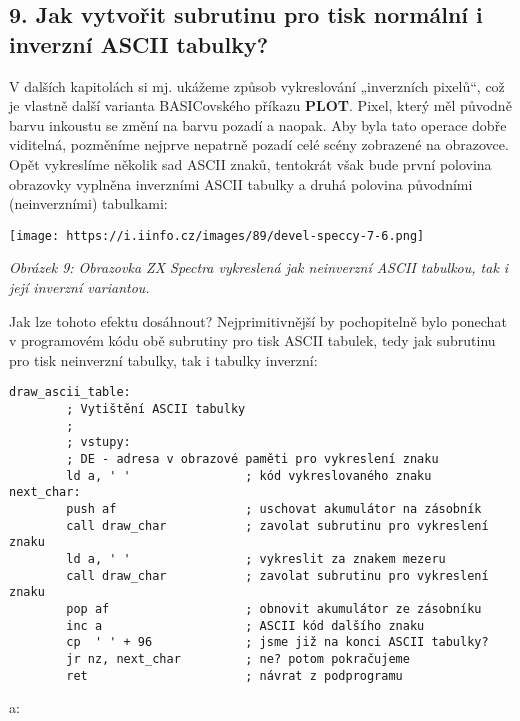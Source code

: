 \documentclass{article}
\renewcommand\includegraphics[2][]{}
\begin{document}
\hypertarget{k09}{%
\subsection{9. Jak vytvořit subrutinu pro tisk normální i inverzní ASCII
tabulky?}\label{k09}}

V dalších kapitolách si mj. ukážeme způsob vykreslování „inverzních
pixelů``, což je vlastně další varianta BASICovského příkazu
\textbf{PLOT}. Pixel, který měl původně barvu inkoustu se změní na barvu
pozadí a naopak. Aby byla tato operace dobře viditelná, pozměníme
nejprve nepatrně pozadí celé scény zobrazené na obrazovce. Opět
vykreslíme několik sad ASCII znaků, tentokrát však bude první polovina
obrazovky vyplněna inverzními ASCII tabulky a druhá polovina původními
(neinverzními) tabulkami:

\texttt{[image: https://i.iinfo.cz/images/89/devel-speccy-7-6.png]}

\emph{Obrázek 9: Obrazovka ZX Spectra vykreslená jak neinverzní ASCII
tabulkou, tak i její inverzní variantou.}

Jak lze tohoto efektu dosáhnout? Nejprimitivnější by pochopitelně bylo
ponechat v programovém kódu obě subrutiny pro tisk ASCII tabulek, tedy
jak subrutinu pro tisk neinverzní tabulky, tak i tabulky inverzní:

\begin{verbatim}
draw_ascii_table:
        ; Vytištění ASCII tabulky
        ;       
        ; vstupy:
        ; DE - adresa v obrazové paměti pro vykreslení znaku
        ld a, ' '                ; kód vykreslovaného znaku
next_char:
        push af                  ; uschovat akumulátor na zásobník
        call draw_char           ; zavolat subrutinu pro vykreslení znaku
        ld a, ' '                ; vykreslit za znakem mezeru
        call draw_char           ; zavolat subrutinu pro vykreslení znaku
        pop af                   ; obnovit akumulátor ze zásobníku
        inc a                    ; ASCII kód dalšího znaku
        cp  ' ' + 96             ; jsme již na konci ASCII tabulky?
        jr nz, next_char         ; ne? potom pokračujeme
        ret                      ; návrat z podprogramu
\end{verbatim}

a:
\end{document}
